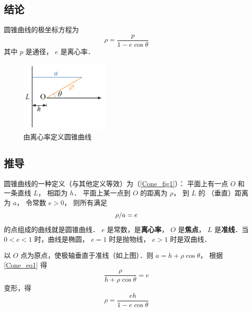 

\subsection{结论}
圆锥曲线的极坐标方程为
\begin{equation}
\rho  = \frac{p}{{1 - e\cos \theta }}
\end{equation}
其中 $p$ 是通径， $e$ 是离心率．

\begin{figure}[ht]
\centering
\includegraphics[width=4.5cm]{./figures/Cone1.pdf}
\caption{由离心率定义圆锥曲线}\label{Cone_fig1}
\end{figure}

\subsection{推导}
圆锥曲线的一种定义（与其他定义等效）为（\autoref{Cone_fig1}）：
平面上有一点 $O$ 和一条直线 $L$， 相距为 $h$． 
平面上某一点到 $O$ 的距离为 $\rho $， 到 $L$ 的
（垂直）距离为 $a$， 令常数 $e > 0$， 则所有满足
\begin{equation}\label{Cone_eq1}
{\rho  \mathord{\left/
 {\vphantom {\rho  a}} \right.
 \kern-\nulldelimiterspace} a} = e
\end{equation}
的点组成的曲线就是圆锥曲线． $e$ 是常数，是\textbf{离心率}， $O$ 是\textbf{焦点}， $L$ 是\textbf{准线}．当 $0 < e < 1$ 时，曲线是椭圆， $e = 1$ 时是抛物线， $e > 1$ 时是双曲线．

以 $O$ 点为原点，使极轴垂直于准线（如上图）．则 $a = h + \rho \cos \theta $， 根据\autoref{Cone_eq1} 得
\begin{equation}\label{Cone_eq2}
\frac{\rho }{{h + \rho \cos \theta }} = e
\end{equation}
变形，得
\begin{equation}\label{Cone_eq3}
\rho  = \frac{{eh}}{{1 - e\cos \theta }}
\end{equation}



